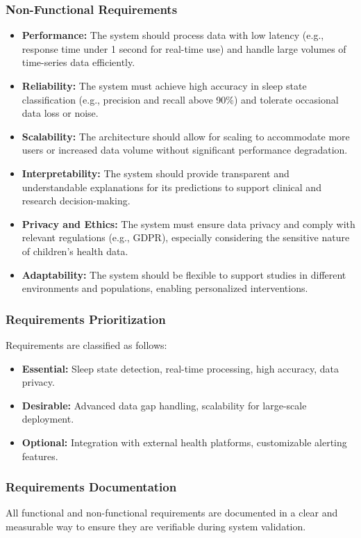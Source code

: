\documentclass[conference]{IEEEtran}
\begin{document}
\subsubsection{Non-Functional Requirements}
\begin{itemize}
	\item \textbf{Performance:} The system should process data with low latency (e.g., response time under 1 second for real-time use) and handle large volumes of time-series data efficiently.
	\item \textbf{Reliability:} The system must achieve high accuracy in sleep state classification (e.g., precision and recall above 90\%) and tolerate occasional data loss or noise.
	\item \textbf{Scalability:} The architecture should allow for scaling to accommodate more users or increased data volume without significant performance degradation.
	\item \textbf{Interpretability:} The system should provide transparent and understandable explanations for its predictions to support clinical and research decision-making.
	\item \textbf{Privacy and Ethics:} The system must ensure data privacy and comply with relevant regulations (e.g., GDPR), especially considering the sensitive nature of children's health data.
	\item \textbf{Adaptability:} The system should be flexible to support studies in different environments and populations, enabling personalized interventions.
\end{itemize}

\subsubsection{Requirements Prioritization}
Requirements are classified as follows:
\begin{itemize}
    \item \textbf{Essential:} Sleep state detection, real-time processing, high accuracy, data privacy.
    \item \textbf{Desirable:} Advanced data gap handling, scalability for large-scale deployment.
    \item \textbf{Optional:} Integration with external health platforms, customizable alerting features.
\end{itemize}

\subsubsection{Requirements Documentation}
All functional and non-functional requirements are documented in a clear and measurable way to ensure they are verifiable during system validation.
\end{document}

